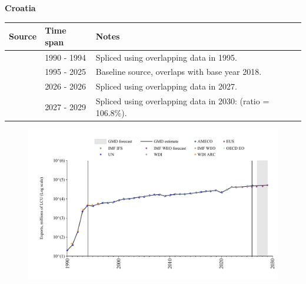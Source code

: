 \documentclass[12pt,a4paper,landscape]{article}
\begin{document}
\begin{adjustbox}{max totalsize={\paperwidth}{\paperheight},center}
\begin{minipage}[t][\textheight][t]{\textwidth}
\vspace*{0.5cm}
{}
\begin{center}
{\Large\bfseries Croatia}
\end{center}
\vspace{0.5cm}
\begin{table}[H]
\centering
\small
\begin{tabular}{|l|l|l|}
\hline
\textbf{Source} & \textbf{Time span} & \textbf{Notes} \\
\hline
\rowcolor{white}\cite{UN}& 1990 - 1994 &Spliced using overlapping data in 1995.\\
\rowcolor{lightgray}\cite{OECD_EO}& 1995 - 2025 &Baseline source, overlaps with base year 2018.\\
\rowcolor{white}\cite{AMECO}& 2026 - 2026 &Spliced using overlapping data in 2027.\\
\rowcolor{lightgray}\cite{IMF_WEO_forecast}& 2027 - 2029 &Spliced using overlapping data in 2030: (ratio = 106.8\%).\\
\hline
\end{tabular}
\end{table}
\begin{figure}[H]
\centering
\includegraphics[width=\textwidth,height=0.6\textheight,keepaspectratio]{graphs/HRV_exports.pdf}
\end{figure}
\end{minipage}
\end{adjustbox}
\end{document}

